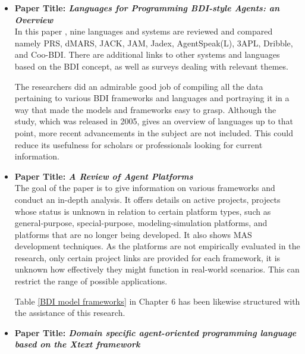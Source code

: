 \begin{itemize}[label={}]

\item \textbf{Paper Title: \textit{Languages for Programming \ac{BDI}-style Agents: an Overview}}\\

In this paper \cite{9lang}, nine languages and systems are reviewed and compared namely PRS, dMARS, JACK, JAM, Jadex, AgentSpeak(L), 3APL, Dribble, and Coo-\ac{BDI}. There are additional links to other systems and languages based on the \ac{BDI} concept, as well as surveys dealing with relevant themes.

\vspace{.5cm}
The researchers did an admirable good job of compiling all the data pertaining to various \ac{BDI} frameworks and languages and portraying it in a way that made the models and frameworks easy to grasp. Although the study, which was released in 2005, gives an overview of languages up to that point, more recent advancements in the subject are not included. This could reduce its usefulness for scholars or professionals looking for current information.
\vspace{.5cm}

\item \textbf{Paper Title: \textit{A Review of Agent Platforms}}\\

The goal of the paper \cite{review} is to give information on various frameworks and conduct an in-depth analysis. It offers details on active projects, projects whose status is unknown in relation to certain platform types, such as general-purpose, special-purpose, modeling-simulation platforms, and platforms that are no longer being developed. It also shows \ac{MAS} development techniques. As the platforms are not empirically evaluated in the research, only certain project links are provided for each framework, it is unknown how effectively they might function in real-world scenarios. This can restrict the range of possible applications.

\vspace{.5cm}

Table \ref{BDI model frameworks} in Chapter 6 has been likewise structured with the assistance of this research.

\vspace{.5cm}

\item \textbf{Paper Title: \textit{Domain specific agent-oriented programming language based on the Xtext framework}} \\


\end{itemize}
